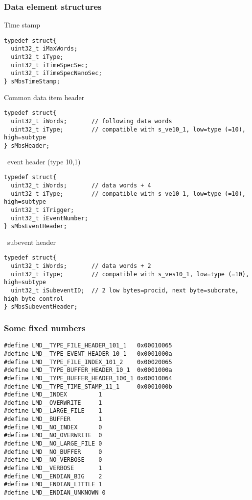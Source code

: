 \subsubsection{Data element structures}
\bbul
\item Time stamp
{\small \begin{verbatim}
typedef struct{
  uint32_t iMaxWords; 
  uint32_t iType; 
  uint32_t iTimeSpecSec;
  uint32_t iTimeSpecNanoSec;
} sMbsTimeStamp;
\end{verbatim}
}
\item Common data item header
{\small \begin{verbatim}
typedef struct{
  uint32_t iWords;       // following data words
  uint32_t iType;        // compatible with s_ve10_1, low=type (=10), high=subtype
} sMbsHeader;
\end{verbatim}
}
\item \mbs\ event header (type 10,1)
{\small \begin{verbatim}
typedef struct{
  uint32_t iWords;       // data words + 4
  uint32_t iType;        // compatible with s_ve10_1, low=type (=10), high=subtype
  uint32_t iTrigger;
  uint32_t iEventNumber;
} sMbsEventHeader;
\end{verbatim}
}
\item \mbs\ subevent header
{\small \begin{verbatim}
typedef struct{
  uint32_t iWords;       // data words + 2
  uint32_t iType;        // compatible with s_ves10_1, low=type (=10), high=subtype
  uint32_t iSubeventID;  // 2 low bytes=procid, next byte=subcrate, high byte control 
} sMbsSubeventHeader;
\end{verbatim}
}
\ebul
\subsubsection{Some fixed numbers}
{\small \begin{verbatim}
#define LMD__TYPE_FILE_HEADER_101_1   0x00010065
#define LMD__TYPE_EVENT_HEADER_10_1   0x0001000a
#define LMD__TYPE_FILE_INDEX_101_2    0x00020065
#define LMD__TYPE_BUFFER_HEADER_10_1  0x0001000a
#define LMD__TYPE_BUFFER_HEADER_100_1 0x00010064
#define LMD__TYPE_TIME_STAMP_11_1     0x0001000b
#define LMD__INDEX         1
#define LMD__OVERWRITE     1
#define LMD__LARGE_FILE    1
#define LMD__BUFFER        1
#define LMD__NO_INDEX      0
#define LMD__NO_OVERWRITE  0
#define LMD__NO_LARGE_FILE 0
#define LMD__NO_BUFFER     0
#define LMD__NO_VERBOSE    0
#define LMD__VERBOSE       1
#define LMD__ENDIAN_BIG    2
#define LMD__ENDIAN_LITTLE 1
#define LMD__ENDIAN_UNKNOWN 0
\end{verbatim}
}
